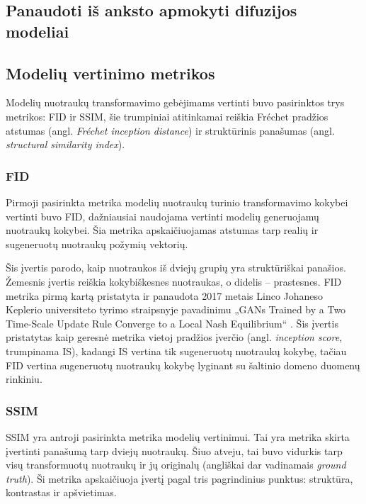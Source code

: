 \documentclass{VUMIFPSbakalaurinis}
\begin{document}
    \subsection{Panaudoti iš anksto apmokyti difuzijos modeliai}
        
    \subsection{Modelių vertinimo metrikos}
        Modelių nuotraukų transformavimo gebėjimams vertinti buvo pasirinktos trys metrikos: FID ir SSIM, šie trumpiniai atitinkamai reiškia Fréchet pradžios atstumas (angl. \emph{Fréchet inception distance}) ir struktūrinis panašumas (angl. \emph{structural similarity index}).
        
        \subsubsection{FID}
            Pirmoji pasirinkta metrika modelių nuotraukų turinio transformavimo kokybei vertinti buvo FID, dažniausiai naudojama vertinti modelių generuojamų nuotraukų kokybei. Šia metrika apskaičiuojamas atstumas tarp realių ir sugeneruotų nuotraukų požymių vektorių.
    
            Šis įvertis parodo, kaip nuotraukos iš dviejų grupių yra struktūriškai panašios. Žemesnis įvertis reiškia kokybiškesnes nuotraukas, o didelis – prastesnes. FID metrika pirmą kartą pristatyta ir panaudota 2017 metais Linco Johaneso Keplerio universiteto tyrimo straipsnyje pavadinimu „GANs Trained by a Two Time-Scale Update Rule Converge to a Local Nash Equilibrium“ \cite{FidStart}. Šis įvertis pristatytas kaip geresnė metrika vietoj pradžios įverčio (angl. \emph{inception score}, trumpinama IS), kadangi IS vertina tik sugeneruotų nuotraukų kokybę, tačiau FID vertina sugeneruotų nuotraukų kokybę lyginant su šaltinio domeno duomenų rinkiniu.

        \subsubsection{SSIM}
            SSIM \cite{SSIM} yra antroji pasirinkta metrika modelių vertinimui. Tai yra metrika skirta įvertinti panašumą tarp dviejų nuotraukų. Šiuo atveju, tai buvo vidurkis tarp visų transformuotų nuotraukų ir jų originalų (angliškai dar vadinamais \emph{ground truth}). Ši metrika apskaičiuoja įvertį pagal tris pagrindinius punktus: struktūra, kontrastas ir apšvietimas.
\end{document}
